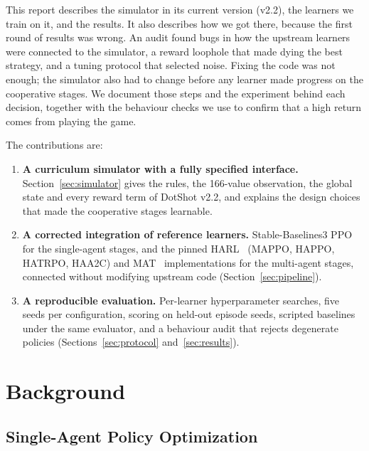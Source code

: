 \documentclass[11pt]{article}
\begin{document}
This report describes the simulator in its current version (v2.2), the learners we train on it, and the results. It also describes how we got there, because the first round of results was wrong. An audit found bugs in how the upstream learners were connected to the simulator, a reward loophole that made dying the best strategy, and a tuning protocol that selected noise. Fixing the code was not enough; the simulator also had to change before any learner made progress on the cooperative stages. We document those steps and the experiment behind each decision, together with the behaviour checks we use to confirm that a high return comes from playing the game.

The contributions are:
\begin{enumerate}
    \item \textbf{A curriculum simulator with a fully specified interface.} Section~\ref{sec:simulator} gives the rules, the 166-value observation, the global state and every reward term of DotShot v2.2, and explains the design choices that made the cooperative stages learnable.
    \item \textbf{A corrected integration of reference learners.} Stable-Baselines3 PPO~\cite{schulman2017ppo} for the single-agent stages, and the pinned HARL~\cite{zhong2024harl} (MAPPO, HAPPO, HATRPO, HAA2C) and MAT~\cite{wen2022mat} implementations for the multi-agent stages, connected without modifying upstream code (Section~\ref{sec:pipeline}).
    \item \textbf{A reproducible evaluation.} Per-learner hyperparameter searches, five seeds per configuration, scoring on held-out episode seeds, scripted baselines under the same evaluator, and a behaviour audit that rejects degenerate policies (Sections~\ref{sec:protocol} and~\ref{sec:results}).
\end{enumerate}

\section{Background}
\label{sec:background}

\subsection{Single-Agent Policy Optimization}
\end{document}
